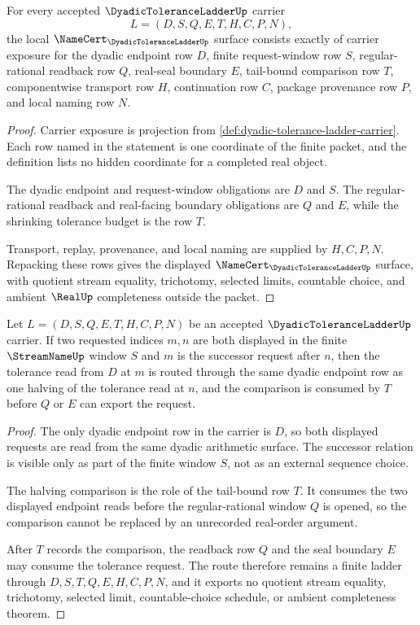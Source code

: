 \begin{theorem}
\label{thm:dyadic-tolerance-ladder-namecert-obligations}
For every accepted $\DyadicToleranceLadderUp$ carrier
$$
L=(D,S,Q,E,T,H,C,P,N),
$$
the local $\NameCert_{\DyadicToleranceLadderUp}$ surface consists exactly of carrier exposure for the dyadic endpoint row $D$, finite request-window row $S$, regular-rational readback row $Q$, real-seal boundary $E$, tail-bound comparison row $T$, componentwise transport row $H$, continuation row $C$, package provenance row $P$, and local naming row $N$.
\end{theorem}
\begin{proof}
Carrier exposure is projection from \autoref{def:dyadic-tolerance-ladder-carrier}. Each row named in the statement is one coordinate of the finite packet, and the definition lists no hidden coordinate for a completed real object.

The dyadic endpoint and request-window obligations are $D$ and $S$. The regular-rational readback and real-facing boundary obligations are $Q$ and $E$, while the shrinking tolerance budget is the row $T$.

Transport, replay, provenance, and local naming are supplied by $H,C,P,N$. Repacking these rows gives the displayed $\NameCert_{\DyadicToleranceLadderUp}$ surface, with quotient stream equality, trichotomy, selected limits, countable choice, and ambient $\RealUp$ completeness outside the packet.
\end{proof}

\begin{theorem}
\label{thm:dyadic-tolerance-ladder-monotone-halving}
Let $L=(D,S,Q,E,T,H,C,P,N)$ be an accepted $\DyadicToleranceLadderUp$ carrier. If two requested indices $m,n$ are both displayed in the finite $\StreamNameUp$ window $S$ and $m$ is the successor request after $n$, then the tolerance read from $D$ at $m$ is routed through the same dyadic endpoint row as one halving of the tolerance read at $n$, and the comparison is consumed by $T$ before $Q$ or $E$ can export the request.
\end{theorem}
\begin{proof}
The only dyadic endpoint row in the carrier is $D$, so both displayed requests are read from the same dyadic arithmetic surface. The successor relation is visible only as part of the finite window $S$, not as an external sequence choice.

The halving comparison is the role of the tail-bound row $T$. It consumes the two displayed endpoint reads before the regular-rational window $Q$ is opened, so the comparison cannot be replaced by an unrecorded real-order argument.

After $T$ records the comparison, the readback row $Q$ and the seal boundary $E$ may consume the tolerance request. The route therefore remains a finite ladder through $D,S,T,Q,E,H,C,P,N$, and it exports no quotient stream equality, trichotomy, selected limit, countable-choice schedule, or ambient completeness theorem.
\end{proof}

